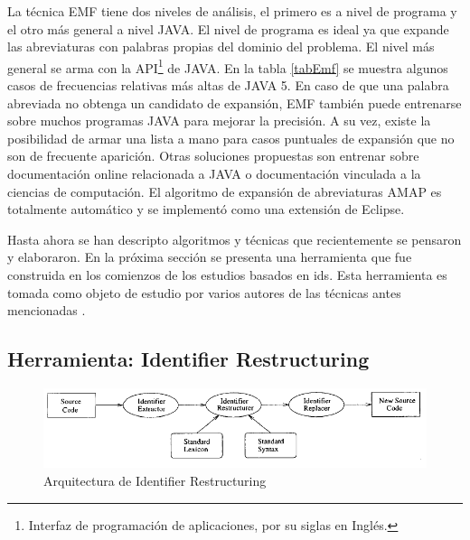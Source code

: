 La técnica EMF tiene dos niveles de análisis, el primero es a nivel de programa y el otro más general a nivel JAVA. El nivel de programa es ideal ya que expande las abreviaturas con palabras propias del dominio del problema. El nivel más general se arma con la API\footnote[1]{Interfaz de programación de aplicaciones, por su siglas en Inglés.} de JAVA. En la tabla \ref{tabEmf} se muestra algunos casos de frecuencias relativas más altas de JAVA 5. En caso de que una palabra abreviada no obtenga un candidato de expansión, EMF también puede entrenarse sobre muchos programas JAVA para mejorar la precisión. A su vez, existe la posibilidad de armar una lista a mano para casos puntuales de expansión que no son de frecuente aparición. Otras soluciones propuestas son entrenar sobre documentación online relacionada a JAVA o documentación vinculada a la ciencias de computación.
El algoritmo de expansión de abreviaturas AMAP es totalmente automático y se implementó como una extensión de Eclipse. %

Hasta ahora se han descripto algoritmos y técnicas que recientemente se pensaron y elaboraron. En la próxima sección se presenta una herramienta que fue construida en los comienzos de los estudios basados en ids. Esta herramienta es tomada como objeto de estudio por varios autores de las técnicas antes mencionadas \cite{EZH08,DCHD06,DLHD06,LFBEX07}.\\


\pagebreak 
\subsection{Herramienta: Identifier Restructuring}
\label{sec:algRest}


\begin{figure}[t!] %
\centerline{%
\includegraphics[scale= 0.80]{./cap3/ire_1.png}
}
\caption{Arquitectura de Identifier Restructuring}
\label{ire1}
\end{figure}


